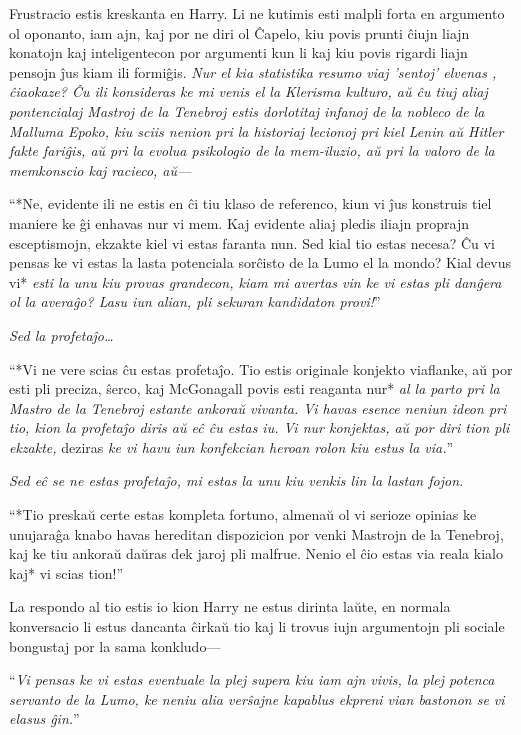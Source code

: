 Frustracio estis kreskanta en Harry. Li ne kutimis esti malpli forta
en argumento ol oponanto, iam ajn, kaj por ne diri ol Ĉapelo, kiu
povis prunti ĉiujn liajn konatojn kaj inteligentecon por argumenti kun
li kaj kiu povis rigardi liajn pensojn ĵus kiam ili
formiĝis. \emph{Nur el kia statistika resumo viaj 'sentoj' elvenas ,
  ĉiaokaze? Ĉu ili konsideras ke mi venis el la Klerisma kulturo, aŭ
  ĉu tiuj aliaj pontencialaj Mastroj de la Tenebroj estis dorlotitaj
  infanoj de la nobleco de la Malluma Epoko, kiu sciis nenion pri la
  historiaj lecionoj pri kiel Lenin aŭ Hitler fakte fariĝis, aŭ pri la
  evolua psikologio de la mem-iluzio, aŭ pri la valoro de la
  memkonscio kaj racieco, aŭ—}

``*Ne, evidente ili ne estis en ĉi tiu klaso de referenco, kiun vi ĵus
konstruis tiel maniere ke ĝi enhavas nur vi mem. Kaj evidente aliaj
pledis iliajn proprajn esceptismojn, ekzakte kiel vi estas faranta
nun. Sed kial tio estas necesa? Ĉu vi pensas ke vi estas la lasta
potenciala sorĉisto de la Lumo el la mondo? Kial devus vi* \emph{esti
  la unu kiu provas grandecon, kiam mi avertas vin ke vi estas pli
  danĝera ol la averaĝo? Lasu iun alian, pli sekuran kandidaton
  provi!}''

\emph{Sed la profetaĵo\ldots}

``*Vi ne vere scias ĉu estas profetaĵo. Tio estis originale konjekto
viaflanke, aŭ por esti pli preciza, ŝerco, kaj McGonagall povis esti
reaganta nur* \emph{al la parto pri la Mastro de la Tenebroj estante
  ankoraŭ vivanta. Vi havas esence neniun ideon pri tio, kion la
  profetaĵo diris aŭ eĉ ĉu estas iu. Vi nur konjektas, aŭ por diri
  tion pli ekzakte,} deziras \emph{ke vi havu iun konfekcian heroan
  rolon kiu estus la via.}''

\emph{Sed eĉ se ne estas profetaĵo, mi estas la unu kiu venkis lin la
  lastan fojon.}

``*Tio preskaŭ certe estas kompleta fortuno, almenaŭ ol vi serioze
opinias ke unujaraĝa knabo havas hereditan dispozicion por venki
Mastrojn de la Tenebroj, kaj ke tiu ankoraŭ daŭras dek jaroj pli
malfrue. Nenio el ĉio estas via reala kialo kaj* vi scias tion!''

La respondo al tio estis io kion Harry ne estus dirinta laŭte, en
normala konversacio li estus dancanta ĉirkaŭ tio kaj li trovus iujn
argumentojn pli sociale bongustaj por la sama konkludo—

``\emph{Vi pensas ke vi estas eventuale la plej supera kiu iam ajn
  vivis, la plej potenca servanto de la Lumo, ke neniu alia verŝajne
  kapablus ekpreni vian bastonon se vi elasus ĝin.}''

